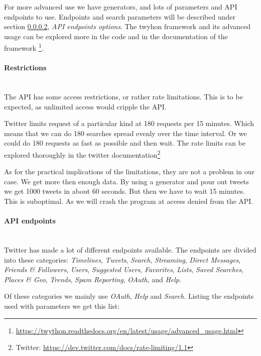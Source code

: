 For more advanced use we have generators, and lots of parameters and API
endpoints to use. Endpoints and search parameters will be described under
section \ref{data:twitter:endpoints}, \textit{API endpoints options}. 
The twyhon framework and its advanced usage can be explored more in the code and
in the documentation of the framework
\footnote{\url{https://twython.readthedocs.org/en/latest/usage/advanced_usage.html}}.
%

\paragraph{Restrictions}
\hspace{0pt}\\
The API has some access restrictions, or rather rate limitations. This is to be
expected, as unlimited access would cripple the API.

Twitter limits request of a particular kind at 180 requests per 15 minutes.
Which means that we can do 180 searches spread evenly over the time interval. Or
we could do 180 requests as fast as possible and then wait. The rate limits can
be explored thoroughly in the twitter documentation\footnote{Twitter:
\url{https://dev.twitter.com/docs/rate-limiting/1.1}}

As for the practical implications  of the limitations, they are not a problem in
our case. We get more then enough data. By using a generator and pour out tweets
we get 1000 tweets in about 60 seconds. But then we have to wait 15 minutes.
This is suboptimal. As we will crash the program at access denied from the API.  
%

\paragraph{API endpoints}\label{data:twitter:endpoints}
\hspace{0pt}\\
Twitter has made a lot of different endpoints available. The endpoints are
divided into these categories: \textit{Timelines}, \textit{Tweets},
\textit{Search}, \textit{Streaming}, \textit{Direct Messages}, \textit{Friends
\& Followers}, \textit{Users}, \textit{Suggested Users}, \textit{Favorites},
\textit{Lists}, \textit{Saved Searches}, \textit{Places \& Geo},
\textit{Trends}, \textit{Spam Reporting}, \textit{OAuth}, and \textit{Help}.

Of these categories we mainly use \textit{OAuth}, \textit{Help} and
\textit{Search}.
Listing the endpoints used with parameters we get this list: 


